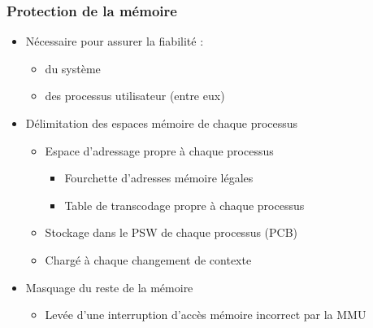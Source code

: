 \begin{frame}
 \frametitle{Protection de la mémoire}
 \begin{itemize}
 \item Nécessaire pour assurer la fiabilité :
\begin{itemize}
\item du système
\item des processus utilisateur (entre eux)
\end{itemize}
\item Délimitation des espaces mémoire de chaque processus
\begin{itemize}
\item Espace d’adressage propre à chaque processus
\begin{itemize}
\item Fourchette d’adresses mémoire légales
\item Table de transcodage propre à chaque processus
\end{itemize}
\item Stockage dans le PSW de chaque processus (PCB)
\item Chargé à chaque changement de contexte
\end{itemize}
\item Masquage du reste de la mémoire
\begin{itemize}
\item Levée d'une interruption d'accès mémoire incorrect par la MMU
\end{itemize}

\end{itemize}
\end{frame}

